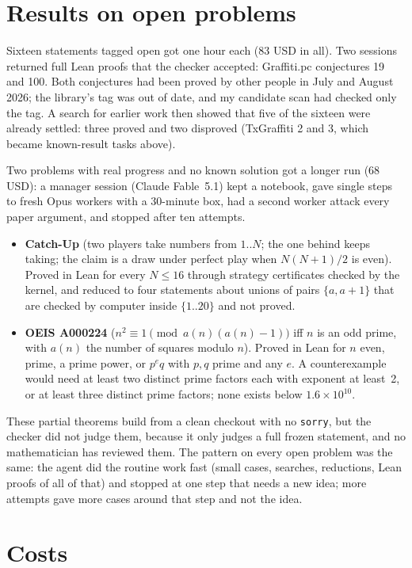 \documentclass[11pt]{article}
\begin{document}
\section{Results on open problems}

Sixteen statements tagged open got one hour each (83 USD in all).
Two sessions returned full Lean proofs that the checker accepted: Graffiti.pc conjectures 19 and 100.
Both conjectures had been proved by other people in July and August 2026; the library's tag was out of date, and my candidate scan had checked only the tag.
A search for earlier work then showed that five of the sixteen were already settled: three proved and two disproved (TxGraffiti 2 and 3, which became known-result tasks above).

Two problems with real progress and no known solution got a longer run (68 USD): a manager session (Claude Fable~5.1) kept a notebook, gave single steps to fresh Opus workers with a 30-minute box, had a second worker attack every paper argument, and stopped after ten attempts.
\begin{itemize}
\item \textbf{Catch-Up} (two players take numbers from $1..N$; the one behind keeps taking; the claim is a draw under perfect play when $N(N+1)/2$ is even). Proved in Lean for every $N\le 16$ through strategy certificates checked by the kernel, and reduced to four statements about unions of pairs $\{a,a+1\}$ that are checked by computer inside $\{1..20\}$ and not proved.
\item \textbf{OEIS A000224} ($n^2\equiv 1 \pmod{a(n)(a(n)-1)}$ iff $n$ is an odd prime, with $a(n)$ the number of squares modulo $n$). Proved in Lean for $n$ even, prime, a prime power, or $p^eq$ with $p,q$ prime and any $e$. A counterexample would need at least two distinct prime factors each with exponent at least~2, or at least three distinct prime factors; none exists below $1.6\times 10^{10}$.
\end{itemize}
These partial theorems build from a clean checkout with no \texttt{sorry}, but the checker did not judge them, because it only judges a full frozen statement, and no mathematician has reviewed them.
The pattern on every open problem was the same: the agent did the routine work fast (small cases, searches, reductions, Lean proofs of all of that) and stopped at one step that needs a new idea; more attempts gave more cases around that step and not the idea.

\section{Costs}
\end{document}

